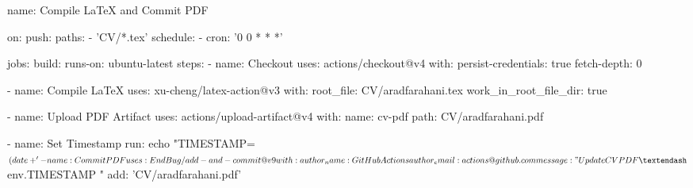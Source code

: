 name: Compile LaTeX and Commit PDF

on:
  push:
    paths:
      - 'CV/*.tex'
  schedule:
    - cron: '0 0 * * *'

jobs:
  build:
    runs-on: ubuntu-latest
    steps:
      - name: Checkout
        uses: actions/checkout@v4
        with:
          persist-credentials: true
          fetch-depth: 0

      - name: Compile LaTeX
        uses: xu-cheng/latex-action@v3
        with:
          root_file: CV/aradfarahani.tex
          work_in_root_file_dir: true

      - name: Upload PDF Artifact
        uses: actions/upload-artifact@v4
        with:
          name: cv-pdf
          path: CV/aradfarahani.pdf

      - name: Set Timestamp
        run: echo "TIMESTAMP=$(date +'%

      - name: Commit PDF
        uses: EndBug/add-and-commit@v9
        with:
          author_name: GitHub Actions
          author_email: actions@github.com
          message: "Update CV PDF – ${{ env.TIMESTAMP }}"
          add: 'CV/aradfarahani.pdf'
